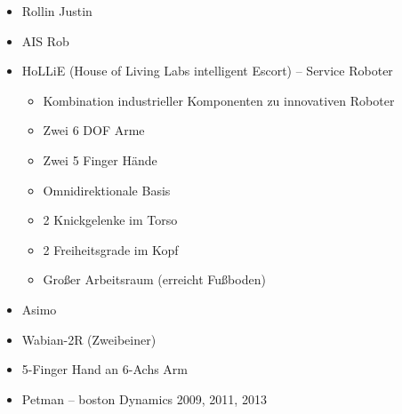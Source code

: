 \begin{itemize}
	\item Rollin Justin
	\item AIS Rob
	\item HoLLiE (House of Living Labs intelligent Escort) -- Service Roboter
	\begin{itemize}
		\item Kombination industrieller Komponenten zu innovativen Roboter
		\item Zwei 6 DOF Arme
		\item Zwei 5 Finger Hände
		\item Omnidirektionale Basis
		\item 2 Knickgelenke im Torso
		\item 2 Freiheitsgrade im Kopf
		\item Großer Arbeitsraum (erreicht Fußboden)
	\end{itemize}
	\item Asimo
	\item Wabian-2R (Zweibeiner)
	\item 5-Finger Hand an 6-Achs Arm
	\item Petman -- boston Dynamics 2009, 2011, 2013
\end{itemize}